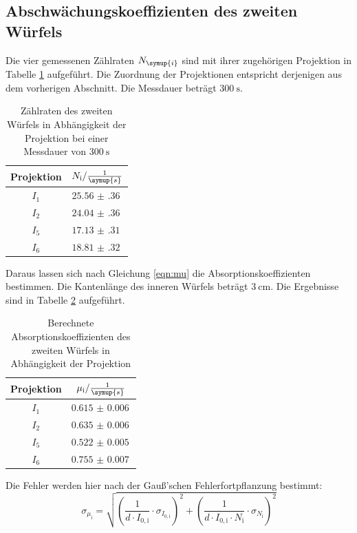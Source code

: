 \subsection{Abschwächungskoeffizienten des zweiten Würfels}

Die vier gemessenen Zählraten $N_\symup{i}$ sind mit ihrer zugehörigen Projektion in Tabelle
\ref{tab:w2} aufgeführt. Die Zuordnung der Projektionen entspricht derjenigen aus dem
vorherigen Abschnitt. Die Messdauer beträgt $\SI{300}{\second}$.

\begin{table}[H]
  \centering
  \caption{Zählraten des zweiten Würfels in Abhängigkeit der Projektion bei einer Messdauer von $\SI{300}{\second}$ }
  \label{tab:w2}
  \begin{tabular}{c c}
    \toprule
    Projektion & $N_{\mathrm{i}} / \frac{1}{\symup{s}}$   \\
    \midrule
        $I_1$    & $\SI{25.56(36)}{}$ \\
        $I_2$    & $\SI{24.04(36)}{}$ \\
        $I_5$    & $\SI{17.13(31)}{}$ \\
        $I_6$    & $\SI{18.81(32)}{}$ \\
    \bottomrule
  \end{tabular}
\end{table}

Daraus lassen sich nach Gleichung \ref{eqn:mu} die Absorptionskoeffizienten bestimmen.
Die Kantenlänge des inneren Würfels beträgt $\SI{3}{\centi\meter}$.
Die Ergebnisse sind in Tabelle \ref{tab:mu2} aufgeführt.

\begin{table}[H]
  \centering
  \caption{Berechnete Absorptionskoeffizienten des zweiten Würfels in Abhängigkeit der Projektion}
  \label{tab:mu2}
  \begin{tabular}{c c}
    \toprule
    Projektion & $\mu_{\mathrm{i}} / \frac{1}{\symup{s}}$   \\
    \midrule
        $I_1$    & $\SI{0.615(6)}{}$ \\
        $I_2$    & $\SI{0.635(6)}{}$ \\
        $I_5$    & $\SI{0.522(5)}{}$ \\
        $I_6$    & $\SI{0.755(7)}{}$ \\
    \bottomrule
  \end{tabular}
\end{table}

Die Fehler werden hier nach der Gauß'schen Fehlerfortpflanzung bestimmt:
\begin{equation*}
  \sigma_{\mu_{\mathrm{i}}} = \sqrt{\left(\frac{1}{d\cdot I_{0,\mathrm{i}}} \cdot \sigma_{I_{0,\mathrm{i}}} \right)^2 + \left( \frac{1}{d\cdot I_{0,\mathrm{i}} \cdot N_{\mathrm{i}}}
  \cdot \sigma_{N_{\mathrm{i}}} \right)^2}
\end{equation*}

